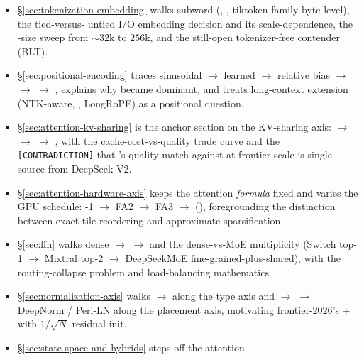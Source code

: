 \begin{itemize}
  \item \S\ref{sec:tokenization-embedding} walks subword 
    (, , tiktoken-family byte-level), the tied-versus-
    untied I/O embedding decision and its scale-dependence, the
    -size sweep from $\sim 32\text{k}$ to $256\text{k}$, and
    the still-open tokenizer-free contender (BLT).
  \item \S\ref{sec:positional-encoding} traces sinusoidal $\to$
    learned $\to$  relative bias $\to$  $\to$  $\to$ ,
    explains why  became dominant, and treats long-context
    extension (NTK-aware, , LongRoPE) as a positional question.
  \item \S\ref{sec:attention-kv-sharing} is the anchor section on the
    KV-sharing axis:  $\to$  $\to$  $\to$ , with the
    cache-cost-vs-quality trade curve and the
    \texttt{[CONTRADICTION]} that 's quality match against  at
    frontier scale is single-source from DeepSeek-V2.
  \item \S\ref{sec:attention-hardware-axis} keeps the attention
    \emph{formula} fixed and varies the GPU schedule:
    -1 $\to$ FA2 $\to$ FA3 $\to$ 
    (), foregrounding the distinction between exact tile-reordering
    and approximate sparsification.
  \item \S\ref{sec:ffn} walks dense  $\to$  $\to$  and
    the dense-vs-MoE multiplicity (Switch top-1 $\to$ Mixtral top-2
    $\to$ DeepSeekMoE fine-grained-plus-shared), with the
    routing-collapse problem and load-balancing mathematics.
  \item \S\ref{sec:normalization-axis} walks  $\to$ 
    along the type axis and  $\to$  $\to$ DeepNorm /
    Peri-LN along the placement axis, motivating frontier-2026's
     +  with $1/\sqrt{N}$ residual init.
  \item \S\ref{sec:state-space-and-hybrids} steps off the attention

\end{itemize}
